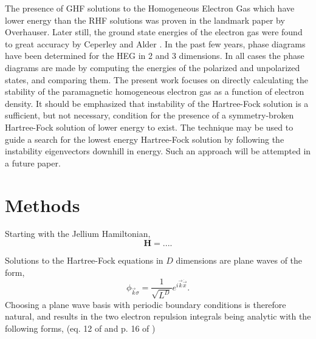 \documentclass{revtex4}
\begin{document}
    The presence of GHF solutions to the Homogeneous Electron Gas which have lower energy than the RHF solutions was proven in the landmark paper by Overhauser\cite{Overhauser1962}. Later still, the ground state energies of the electron gas were found to great accuracy by Ceperley and Alder \cite{Ceperley1980}. In the past few years, phase diagrams have been determined for the HEG in 2 and 3 dimensions\cite{Delyon2008}\cite{Bernu2011}\cite{Baguet2013}. In all cases the phase diagrams are made by computing the energies of the polarized and unpolarized states, and comparing them. The present work focuses on directly calculating the stability of the paramagnetic homogeneous electron gas as a function of electron density. It should be emphasized that instability of the Hartree-Fock solution is a sufficient, but not necessary, condition for the presence of a symmetry-broken Hartree-Fock solution of lower energy to exist. The technique may be used to guide a search for the lowest energy Hartree-Fock solution by following the instability eigenvectors downhill in energy. Such an approach will be attempted in a future paper. 
    
\section{Methods}    
	
	Starting with the Jellium Hamiltonian, 
	\begin{equation}\label{hamiltonian}
		\mathbf{H} = ....
	\end{equation}
	
	Solutions to the Hartree-Fock equations in $D$ dimensions are plane waves of the form, 
	\begin{equation}\label{planewave}
		\phi_{\vec{k} \sigma} =
		   \frac{1} { \sqrt{L ^ D} } e ^ {i \vec{k} \dot \vec{x}}.
	\end{equation}
	Choosing a plane wave basis with periodic boundary conditions is therefore natural, and results in the two electron repulsion integrals being analytic with the following forms, (eq. 12 of \cite{Delyon2008} and p. 16 of \cite{Guiliani2005})
    
\end{document}
